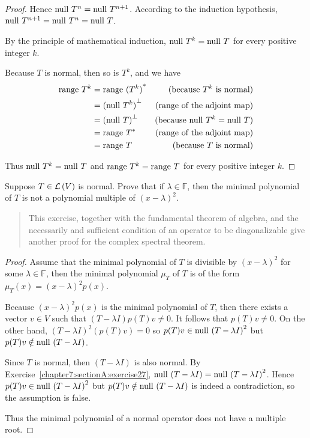 \begin{proof}
    Hence $\operatorname{null}\,{T^{n}} = \operatorname{null}\,{T^{n+1}}$. According to the induction hypothesis, $\operatorname{null}\,{T^{n+1}} = \operatorname{null}\,{T^{n}} = \operatorname{null}\,{T}$.

    By the principle of mathematical induction, $\operatorname{null}\,{T^{k}} = \operatorname{null}\,{T}$ for every positive integer $k$.

    Because $T$ is normal, then so is $T^{k}$, and we have
    \begin{align*}
        \operatorname{range}\,{T^{k}} & = \operatorname{range}\,{(T^{k})}^{*} & \text{(because $T^{k}$ is normal)} \\
                      & = {(\operatorname{null}\,{T^{k}})}^{\bot} & \text{(range of the adjoint map)} \\
                      & = {(\operatorname{null}\,{T})}^{\bot} & \text{(because $\operatorname{null}\,{T^{k}} = \operatorname{null}\,{T}$)} \\
                      & = \operatorname{range}\,{T^{*}}  & \text{(range of the adjoint map)} \\
                      & = \operatorname{range}\,{T} & \text{(because $T$ is normal)}
    \end{align*}

    Thus $\operatorname{null}\,{T^{k}} = \operatorname{null}\,{T}$ and $\operatorname{range}\,{T^{k}} = \operatorname{range}\,{T}$ for every positive integer $k$.
\end{proof}
\newpage

\begin{exercise}
    Suppose $T\in\mathcal{L}\left({V}\right)$ is normal. Prove that if $\lambda\in\mathbb{F}$, then the minimal polynomial of $T$ is not a polynomial multiple of ${(x - \lambda)}^{2}$.
\end{exercise}

\begin{quote}
    This exercise, together with the fundamental theorem of algebra, and the necessarily and sufficient condition of an operator to be diagonalizable give another proof for the complex spectral theorem.
\end{quote}

\begin{proof}
    Assume that the minimal polynomial of $T$ is divisible by ${(x - \lambda)}^{2}$ for some $\lambda\in\mathbb{F}$, then the minimal polynomial $\mu_{T}$ of $T$ is of the form $\mu_{T}(x) = {(x - \lambda)}^{2}p(x)$.

    Because ${(x - \lambda)}^{2}p(x)$ is the minimal polynomial of $T$, then there exists a vector $v\in V$ such that $(T - \lambda I)p(T)v \ne 0$. It follows that $p(T)v \ne 0$. On the other hand, ${(T - \lambda I)}^{2}(p(T)v) = 0$ so $p(T)v\in \operatorname{null}\,{{(T - \lambda I)}^{2}}$ but $p(T)v\notin \operatorname{null}\,{(T - \lambda I)}$.

    Since $T$ is normal, then $(T - \lambda I)$ is also normal. By Exercise~\ref{chapter7:sectionA:exercise27}, $\operatorname{null}\,{(T - \lambda I)} = \operatorname{null}\,{{(T - \lambda I)}^{2}}$. Hence $p(T)v\in \operatorname{null}\,{{(T - \lambda I)}^{2}}$ but $p(T)v\notin \operatorname{null}\,{(T - \lambda I)}$ is indeed a contradiction, so the assumption is false.

    Thus the minimal polynomial of a normal operator does not have a multiple root.
\end{proof}
\newpage

